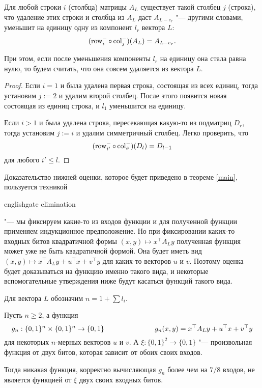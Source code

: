 \documentclass[a4paper, 14pt]{extarticle}
\begin{document}
\begin{lemma} \label{easy}
Для любой строки $i$ (столбца) матрицы $A_L$ существует такой столбец $j$
(строка), что удаление этих строки и столбца из $A_L$ даст $A_{L - e_r}$ "---
другими словами, уменьшит на единицу одну из компонент $l_r$ вектора $L$:
\[
(\operatorname{row}^-_i \circ \operatorname{col}^-_j)(A_L) = A_{L - e_r}.
\]

При этом, если после уменьшения компоненты $l_r$ на единицу она стала равна нулю,
то будем считать, что она совсем удаляется из вектора $L$.
\end{lemma}
\begin{proof}
Если $i = 1$ и была удалена первая строка, состоящая из всех единиц, тогда
установим $j := 2$ и удалим второй столбец. После этого появится новая состоящая
из единиц строка, и $l_1$ уменьшится на единицу.

Если $i > 1$ и была удалена строка, пересекающая какую-то из подматриц $D_r$,
тогда установим $j := i$ и удалим симметричный столбец. Легко проверить, что
\[
(\operatorname{row}^-_{i'} \circ \operatorname{col}^-_{i'})(D_l) = D_{l-1}
\]
для любого $i' \leq l$.
\end{proof}

Доказательство нижней оценки, которое будет приведено в теореме
\ref{main}, пользуется техникой \begin{foreignlanguage}{english}gate
elimination\end{foreignlanguage} "--- мы фиксируем какие-то из входов функции
и для полученной функции применяем индукционное предположение. Но при
фиксировании каких-то входных битов квадратичной формы $(x, y) \mapsto x^\top A_L
y$ полученная функция может уже не быть квадратичной формой. Она будет иметь
вид $(x, y) \mapsto x^\top A_L y + u^\top x + v^\top y$ для каких-то векторов
$u$ и $v$. Поэтому оценка будет доказываться на функцию именно такого вида, и
некоторые вспомогательные утверждения ниже будут касаться функций такого вида.

\begin{lemma} \label{tough}
Для вектора $L$ обозначим $n = 1 + \sum l_i$.

Пусть $n \geq 2$, а функция
\[
g_n : \{0, 1\}^n \times \{0, 1\}^n \to \{0, 1\} \hspace{2.5cm}
g_n(x, y) = x^\top A_L y + u^\top x + v^\top y
\]
для некоторых $n$-мерных векторов $u$ и $v$. А $\xi : \{0, 1\}^2 \to \{0, 1\}$
"--- произвольная функция от двух битов, которая зависит от обоих своих входов.

Тогда никакая функция, корректно вычисляющая $g_n$ более чем на $7/8$ входов, не
является функцией от $\xi$ двух своих входных битов.
\end{lemma}
\end{document}
